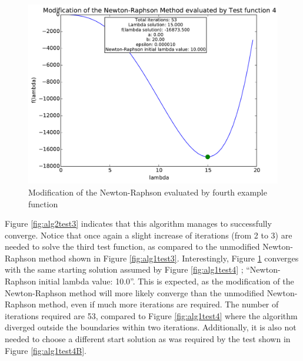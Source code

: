 \documentclass[a4paper,10pt]{article}
\begin{document}
\begin{figure}[h]
\centering
 \includegraphics[scale=0.55]{./graphs/algorithm2/x_in_middel/testFunction4.pdf} 
 \caption{Modification of the Newton-Raphson evaluated by fourth example function}
 \label{fig:alg2test4}
\end{figure}

Figure \ref{fig:alg2test3} indicates that this algorithm manages to successfully converge. Notice that once again a slight increase of iterations (from 2 to 3) are needed to solve the third test function, as compared to the unmodified Newton-Raphson method shown in Figure \ref{fig:alg1test3}. Interestingly, Figure \ref{fig:alg2test4} converges with the same starting solution assumed by Figure \ref{fig:alg1test4} ; ``Newton-Raphson initial lambda value: 10.0''. This is expected, as the modification of the Newton-Raphson method will more likely converge than the unmodified Newton-Raphson method, even if much more iterations are required. The number of iterations required are 53, compared to Figure \ref{fig:alg1test4} where the algorithm diverged outside the boundaries within two iterations. Additionally, it is also not needed to choose a different start solution as was required by the test shown in Figure \ref{fig:alg1test4B}. 

\newpage
\end{document}
